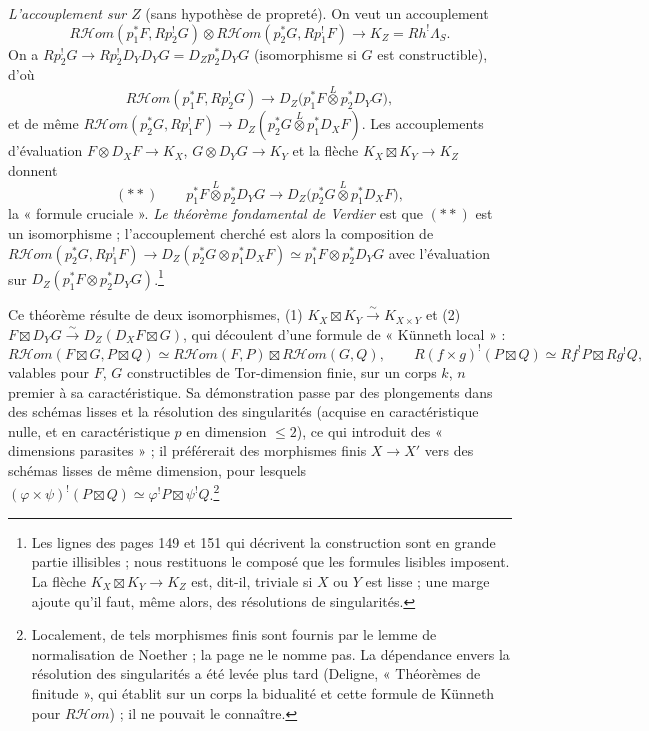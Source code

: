 \documentclass[11pt,a4paper]{article}
\begin{document}
\emph{L'accouplement sur $Z$} (sans hypothèse de propreté). On veut un
accouplement
\[
  R\mathcal{H}om(p_{1}^{*}F, Rp_{2}^{!}G) \otimes R\mathcal{H}om(p_{2}^{*}G,
  Rp_{1}^{!}F) \longrightarrow K_{Z} = Rh^{!}\Lambda_{S}.
\]
On a $Rp_{2}^{!}G \to Rp_{2}^{!}D_{Y}D_{Y}G = D_{Z}p_{2}^{*}D_{Y}G$ (isomorphisme si
$G$ est constructible), d'où
\[
  R\mathcal{H}om(p_{1}^{*}F, Rp_{2}^{!}G) \to D_{Z}\bigl(p_{1}^{*}F
  \overset{L}{\otimes} p_{2}^{*}D_{Y}G\bigr),
\]
et de même $R\mathcal{H}om(p_{2}^{*}G, Rp_{1}^{!}F) \to D_{Z}(p_{2}^{*}G
\overset{L}{\otimes} p_{1}^{*}D_{X}F)$. Les accouplements d'évaluation $F
\otimes D_{X}F \to K_{X}$, $G \otimes D_{Y}G \to K_{Y}$ et la flèche $K_{X}
\boxtimes K_{Y} \to K_{Z}$ donnent
\[
  (\ast\ast)\qquad p_{1}^{*}F \overset{L}{\otimes} p_{2}^{*}D_{Y}G
  \longrightarrow D_{Z}\bigl(p_{2}^{*}G \overset{L}{\otimes}
  p_{1}^{*}D_{X}F\bigr),
\]
la « formule cruciale ». \emph{Le théorème fondamental de Verdier} est que
$(\ast\ast)$ est un isomorphisme ; l'accouplement cherché est alors la
composition de $R\mathcal{H}om(p_{2}^{*}G, Rp_{1}^{!}F) \to D_{Z}(p_{2}^{*}G
\otimes p_{1}^{*}D_{X}F) \simeq p_{1}^{*}F \otimes p_{2}^{*}D_{Y}G$ avec
l'évaluation sur $D_{Z}(p_{1}^{*}F \otimes p_{2}^{*}D_{Y}G)$.\footnote{Les
lignes des pages 149 et 151 qui décrivent la construction sont en grande partie
illisibles ; nous restituons le composé que les formules lisibles imposent. La
flèche $K_{X} \boxtimes K_{Y} \to K_{Z}$ est, dit-il, triviale si $X$ ou $Y$ est
lisse ; une marge ajoute qu'il faut, même alors, des résolutions de
singularités.}

Ce théorème résulte de deux isomorphismes, (1) $K_{X} \boxtimes K_{Y}
\xrightarrow{\sim} K_{X \times Y}$ et (2) $F \boxtimes D_{Y}G
\xrightarrow{\sim} D_{Z}(D_{X}F \boxtimes G)$, qui découlent d'une
formule de « Künneth local » :
\[
  R\mathcal{H}om(F \boxtimes G, P \boxtimes Q) \simeq R\mathcal{H}om(F, P)
  \boxtimes R\mathcal{H}om(G, Q), \qquad R(f \times g)^{!}(P \boxtimes Q)
  \simeq Rf^{!}P \boxtimes Rg^{!}Q,
\]
valables pour $F$, $G$ constructibles de Tor-dimension finie, sur un corps $k$,
$n$ premier à sa caractéristique. Sa démonstration passe par des plongements
dans des schémas lisses et la résolution des singularités (acquise en
caractéristique nulle, et en caractéristique $p$ en dimension $\leq 2$), ce
qui introduit des « dimensions parasites » ; il préférerait des morphismes
finis $X \to X'$ vers des schémas lisses de même dimension, pour lesquels
$(\varphi \times \psi)^{!}(P \boxtimes Q) \simeq \varphi^{!}P \boxtimes
\psi^{!}Q$.\footnote{Localement, de tels morphismes finis sont fournis par le
lemme de normalisation de Noether ; la page ne le nomme pas. La dépendance
envers la résolution des singularités a été levée plus tard (Deligne,
« Théorèmes de finitude », qui établit sur un corps la bidualité et cette
formule de Künneth pour $R\mathcal{H}om$) ; il ne pouvait le connaître.}
\end{document}
